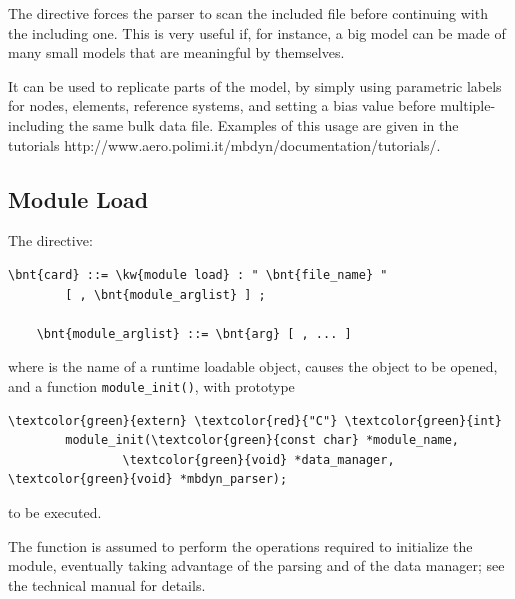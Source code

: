 \bigskip


\bigskip

The  directive forces the parser to scan the included file
 before continuing with the including one.
This is very useful if, for instance, a big model can be made of many
small models that are meaningful by themselves.

It can be used to replicate parts of the model, by simply using parametric 
labels for nodes, elements, reference systems, and setting a bias value 
before multiple-including the same bulk data file.
Examples of this usage are given in the tutorials
	{http://www.aero.polimi.it/mbdyn/documentation/tutorials/}.



\subsection{Module Load}
\label{sec:GENERAL:MODULE-LOAD}
The  directive:
\begin{Verbatim}[commandchars=\\\{\}]
    \bnt{card} ::= \kw{module load} : " \bnt{file_name} "
        [ , \bnt{module_arglist} ] ;

    \bnt{module_arglist} ::= \bnt{arg} [ , ... ]
\end{Verbatim}
where  is the name of a runtime loadable object,
causes the object to be opened, and a function \texttt{module\_init()},
with prototype
\begin{Verbatim}[commandchars=\\\{\}]
        \textcolor{green}{extern} \textcolor{red}{"C"} \textcolor{green}{int}
        module_init(\textcolor{green}{const char} *module_name,
                \textcolor{green}{void} *data_manager, \textcolor{green}{void} *mbdyn_parser);
\end{Verbatim}
to be executed.

The function is assumed to perform the operations required to initialize
the module, eventually taking advantage of the parsing
and of the data manager; see the technical manual for details.

